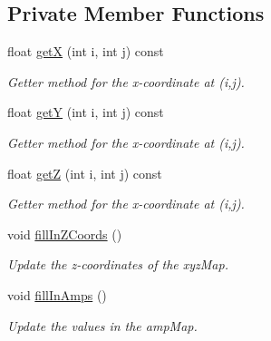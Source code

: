 \subsection*{Private Member Functions}
\begin{DoxyCompactItemize}
\item 
float \hyperlink{class_p_m_d_camera_a6d5662f8c84cb9c12ad71a70159a6f3a}{getX} (int i, int j) const
\begin{DoxyCompactList}\small\item\em Getter method for the x-\/coordinate at (i,j). \end{DoxyCompactList}\item 
float \hyperlink{class_p_m_d_camera_a71344967a964b6c45fc7dfd8b5f56e63}{getY} (int i, int j) const
\begin{DoxyCompactList}\small\item\em Getter method for the x-\/coordinate at (i,j). \end{DoxyCompactList}\item 
float \hyperlink{class_p_m_d_camera_a98254399959993d8a181f17402845457}{getZ} (int i, int j) const
\begin{DoxyCompactList}\small\item\em Getter method for the x-\/coordinate at (i,j). \end{DoxyCompactList}\item 
void \hyperlink{class_p_m_d_camera_a9d67405b9e1e4d4631b218adaa0326ed}{fill\+In\+Z\+Coords} ()
\begin{DoxyCompactList}\small\item\em Update the z-\/coordinates of the xyz\+Map. \end{DoxyCompactList}\item 
void \hyperlink{class_p_m_d_camera_aba055c818c275cf76d73527395937943}{fill\+In\+Amps} ()
\begin{DoxyCompactList}\small\item\em Update the values in the amp\+Map. \end{DoxyCompactList}\end{DoxyCompactItemize}
